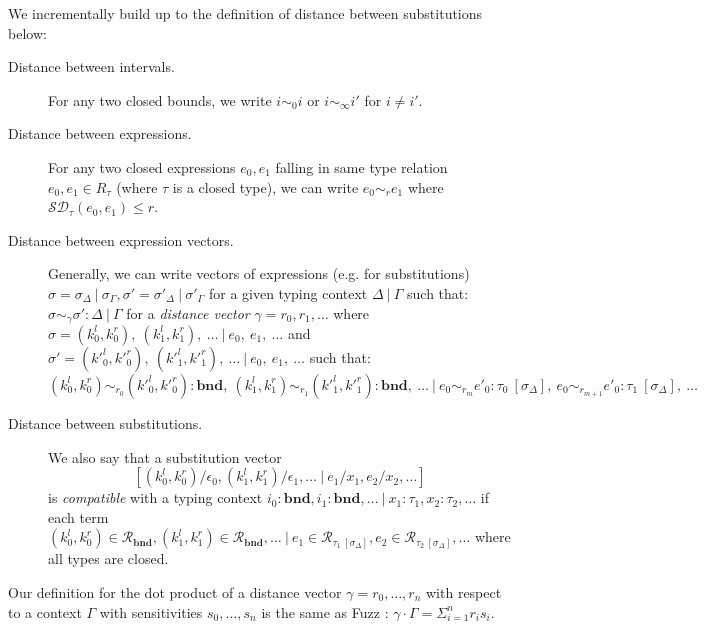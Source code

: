 \begin{definition}
We incrementally build up to the definition of distance between substitutions
below:
\begin{description}
  \item[Distance between intervals.] For any two closed bounds, we write $i
  \sim_0 i$ or $i \sim_{\infty} i'$ for $i \not= i'$. 

  \item[Distance between expressions.] For any two closed expressions $e_0, e_1$
  falling in same type relation $e_0, e_1 \in R_\tau$ (where $\tau$ is a closed
  type), we can write $e_0 \sim_r e_1$ where $\mathcal{SD}_{\tau}(e_0, e_1) \leq
  r$. 

  \item[Distance between expression vectors.]
    Generally, we can write vectors of expressions (e.g. for substitutions) $\sigma =
    \sigma_{\Delta} \ | \ \sigma_{\Gamma}, \sigma' = \sigma'_{\Delta} \ | \
    \sigma'_{\Gamma}$
    for a given typing context $\Delta \ | \ \Gamma$ such that: $\sigma \sim_{\gamma} \sigma'
    : \Delta \ | \ \Gamma$ for a \textit{distance vector}
    $\gamma = r_0, r_1, \ldots$
    where
    $\sigma = (k^l_0, k^r_0),~(k^l_1, k^r_1),~\ldots \ | \ e_0,~e_1,~\ldots$ 
    and 
    $\sigma' = (k'^l_0, k'^r_0),~(k'^l_1, k'^r_1),~\ldots \ | \ e_0,~e_1,~\ldots$ 
    such that:
    $$
    (k^l_0, k^r_0) \sim_{r_0} (k'^l_0, k'^r_0) : \mathbf{bnd},~(k^l_1, k^r_1) \sim_{r_1} (k'^l_1, k'^r_1) : \mathbf{bnd},~\ldots \
    | \ e_0 \sim_{r_m} e'_0 :
    \tau_0~[\sigma_{\Delta}],~e_0 \sim_{r_{m+1}} e'_0 :
    \tau_1~[\sigma_{\Delta}],~\ldots
    $$

  \item[Distance between substitutions.]
    We also say that a substitution vector 
    $$[(k^l_0, k^r_0) / \epsilon_0, (k^l_1, k^r_1) / \epsilon_1, \ldots \ | \ e_1/x_1, e_2/x_2, \ldots]$$
    is \textit{compatible} with a typing context 
    $i_0 : \mathbf{bnd}, i_1 : \mathbf{bnd}, \ldots \ | \ x_1 : \tau_1, x_2 : \tau_2, \ldots$
    if each term 
    $(k^l_0, k^r_0) \in \mathcal{R}_{\mathbf{bnd}}, 
    (k^l_1, k^r_1) \in \mathcal{R}_{\mathbf{bnd}}, 
    \ldots \ | 
    \ e_1 \in \mathcal{R}_{\tau_1~[\sigma_{\Delta}]}, 
    e_2 \in \mathcal{R}_{\tau_2~[\sigma_{\Delta}]}, \ldots$ where all types are closed.
\end{description}
\end{definition}

\begin{definition}
Our definition for the dot product of a distance vector $\gamma = r_0, \ldots,
r_n$ with respect to a context $\Gamma$ with sensitivities $s_0, \ldots, s_n$ is
the same as Fuzz \cite{Fuzz}:
$\gamma \cdot \Gamma = \Sigma_{i = 1}^n r_i s_i$.
\end{definition}

